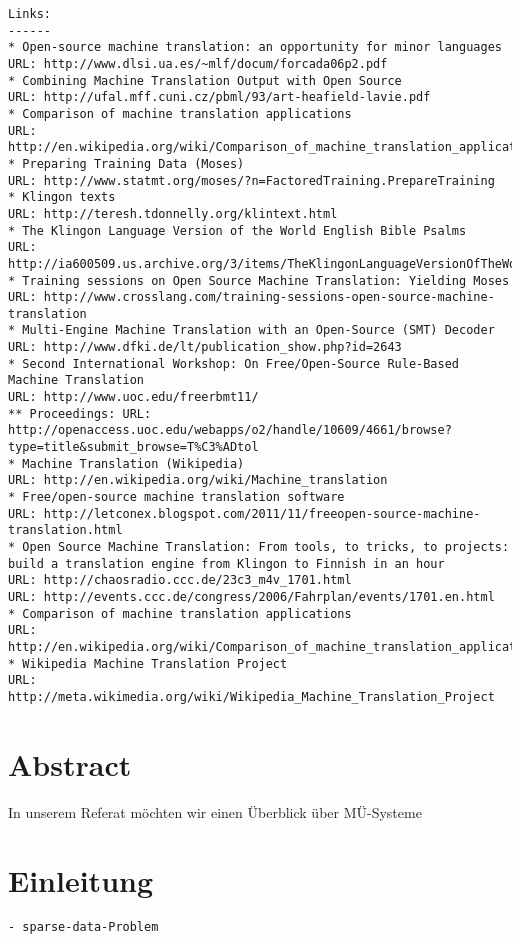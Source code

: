 \documentclass[11pt,twoside]{mparticle}
\begin{document}
\begin{verbatim}
Links:
------
* Open-source machine translation: an opportunity for minor languages
URL: http://www.dlsi.ua.es/~mlf/docum/forcada06p2.pdf
* Combining Machine Translation Output with Open Source
URL: http://ufal.mff.cuni.cz/pbml/93/art-heafield-lavie.pdf
* Comparison of machine translation applications
URL: http://en.wikipedia.org/wiki/Comparison_of_machine_translation_applications
* Preparing Training Data (Moses)
URL: http://www.statmt.org/moses/?n=FactoredTraining.PrepareTraining
* Klingon texts
URL: http://teresh.tdonnelly.org/klintext.html
* The Klingon Language Version of the World English Bible Psalms
URL: http://ia600509.us.archive.org/3/items/TheKlingonLanguageVersionOfTheWorldEnglishBiblePsalms/kp.html#k80
* Training sessions on Open Source Machine Translation: Yielding Moses
URL: http://www.crosslang.com/training-sessions-open-source-machine-translation
* Multi-Engine Machine Translation with an Open-Source (SMT) Decoder
URL: http://www.dfki.de/lt/publication_show.php?id=2643
* Second International Workshop: On Free/Open-Source Rule-Based Machine Translation
URL: http://www.uoc.edu/freerbmt11/
** Proceedings: URL: http://openaccess.uoc.edu/webapps/o2/handle/10609/4661/browse?type=title&submit_browse=T%C3%ADtol
* Machine Translation (Wikipedia)
URL: http://en.wikipedia.org/wiki/Machine_translation
* Free/open-source machine translation software
URL: http://letconex.blogspot.com/2011/11/freeopen-source-machine-translation.html
* Open Source Machine Translation: From tools, to tricks, to projects: build a translation engine from Klingon to Finnish in an hour
URL: http://chaosradio.ccc.de/23c3_m4v_1701.html
URL: http://events.ccc.de/congress/2006/Fahrplan/events/1701.en.html
* Comparison of machine translation applications
URL: http://en.wikipedia.org/wiki/Comparison_of_machine_translation_applications
* Wikipedia Machine Translation Project
URL: http://meta.wikimedia.org/wiki/Wikipedia_Machine_Translation_Project
\end{verbatim}

\section{Abstract}
\label{abstract}
In unserem Referat möchten wir einen Überblick über MÜ-Systeme

\section{Einleitung}
\label{grundlagen}
\begin{verbatim}
- sparse-data-Problem
\end{verbatim}
\end{document}
